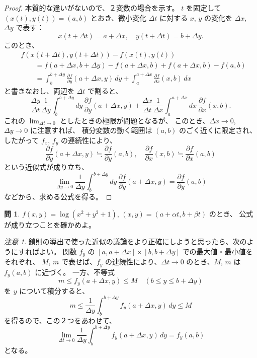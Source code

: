 \documentclass[a4paper]{jsarticle}
\theoremstyle{definition}
\newtheorem{Exercise}{問}%
\theoremstyle{remark}
\newtheorem{Remark}{注意}
\newcommand{\del}{\partial}
\begin{document}
\begin{proof} 本質的な違いがないので、２変数の場合を示す。
$t$ を固定して $(x(t),y(t)) = (a,b)$ とおき、微小変化 $\Delta t$ に対する
$x$, $y$ の変化を $\Delta x$, $\Delta y$ で表す：
\[
x(t+\Delta t) = a + \Delta x, 
\quad 
y(t+\Delta t) = b + \Delta y.
\]
このとき、
\[
\begin{split}
&f(x(t+\Delta t), y(t+\Delta t)) - f(x(t),y(t))\\
&\qquad= f(a +\Delta x, b +\Delta y) - f(a+\Delta x,b) 
+ f(a+\Delta x,b) -f(a,b)\\
&\qquad= \int_{b}^{b + \Delta y} 
\frac{\del f}{\del y}(a + \Delta x, y)\,dy
 + \int_{a}^{a+\Delta x} \frac{\del f}{\del x}(x,b)\, dx
\end{split}
\]
と書きなおし、両辺を $\Delta t$ で割ると、
\[
\frac{\Delta y}{\Delta t} \frac{1}{\Delta y} 
\int_{b}^{b + \Delta y}dy\, \dfrac{\del f}{\del y}(a + \Delta x, y)
 + \frac{\Delta x}{\Delta t} \frac{1}{\Delta x} 
 \int_a^{a+\Delta x}dx\, \dfrac{\del f}{\del x}(x,b). 
\]
これの $\displaystyle \lim_{\Delta t \to 0}$ としたときの極限が問題となるが、
このとき、$\Delta x \to 0$, $\Delta y \to 0$ に注意すれば、
積分変数の動く範囲は $(a,b)$ のごく近くに限定され、したがって $f_x$, $f_y$ の連続性により、
\[
\frac{\del f}{\del y}(a+\Delta x,y) 
\fallingdotseq \frac{\del f}{\del y}(a,b),\quad
\frac{\del f}{\del x}(x,b) \fallingdotseq \frac{\del f}{\del x}(a,b)
\]
という近似式が成り立ち、
\[
\lim_{\Delta y \to 0} \frac{1}{\Delta y} \int_b^{b+\Delta y} dy\,
\frac{\del f}{\del y}(a+\Delta x,y) = \frac{\del f}{\del y}(a,b)
\]
などから、求める公式を得る。
\end{proof}

\begin{Exercise}
$f(x,y) = \log(x^2+y^2+1)$, $(x,y) = (a + \alpha t, b + \beta t)$ のとき、
公式が成り立つことを確かめよ。
\end{Exercise}

\begin{Remark}{\small 
鎖則の導出で使った近似の議論をより正確にしようと思ったら、次のようにすればよい。
関数 $f_y$ の $[a,a+\Delta x]\times [b,b+\Delta y]$ での最大値・最小値をそれぞれ、
$M$, $m$ で表せば、$f_y$ の連続性により、$\Delta t \to 0$ のとき、$M$, $m$ は $f_y(a,b)$ に近づく。
一方、不等式
\[
m \leq f_y(a + \Delta x, y) \leq M 
\quad (b \leq y \leq b + \Delta y)
\]
を $y$ について積分すると、
\[
m \leq \frac{1}{\Delta y} \int_b^{b+\Delta y} f_y(a+\Delta x, y)\, dy \leq M 
\]
を得るので、この２つをあわせて、
\[
\lim_{\Delta t \to 0} \frac{1}{\Delta y} \int_b^{b+\Delta y} f_y(a+\Delta x, y)\, dy = f_y(a,b) 
\]
となる。}
\end{Remark} 
\end{document}
